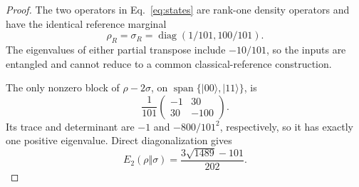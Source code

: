 \documentclass[11pt]{article}
\newcommand{\ket}[1]{\lvert #1\rangle}
\begin{document}
\begin{proof}
The two operators in Eq.~\eqref{eq:states} are rank-one density operators and
have the identical reference marginal
\begin{equation}
 \rho_R=\sigma_R=\operatorname{diag}(1/101,100/101).
 \label{eq:marginal}
\end{equation}
The eigenvalues of either partial transpose include $-10/101$, so the inputs
are entangled and cannot reduce to a common classical-reference construction.

The only nonzero block of $\rho-2\sigma$, on
$\operatorname{span}\{\ket{00},\ket{11}\}$, is
\begin{equation}
 \frac1{101}\begin{pmatrix}-1&30\\30&-100\end{pmatrix}.
\end{equation}
Its trace and determinant are $-1$ and $-800/101^2$, respectively, so it has
exactly one positive eigenvalue.  Direct diagonalization gives
\begin{equation}
 E_2(\rho\Vert\sigma)=\frac{3\sqrt{1489}-101}{202}.
 \label{eq:inputE}
\end{equation}


\end{proof}
\end{document}
